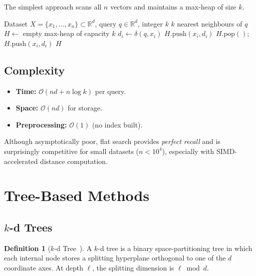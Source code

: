\documentclass[11pt,a4paper]{article}
\theoremstyle{definition}
\newtheorem{definition}{Definition}[section]
\newcommand{\R}{\mathbb{R}}
\newcommand{\calO}{\mathcal{O}}
\begin{document}
The simplest approach scans all $n$ vectors and maintains a max-heap of
size $k$.

\begin{algorithm}[H]
\caption{Flat $k$-NN Search}
\begin{algorithmic}[1]
\Require Dataset $X = \{x_1,\ldots,x_n\}\subset\R^d$, query $q\in\R^d$, integer $k$
\Ensure $k$ nearest neighbours of $q$
\State $H \gets$ empty max-heap of capacity $k$ 
  \State $d_i \gets \delta(q, x_i)$
    \State $H.\text{push}(x_i, d_i)$
    \State $H.\text{pop}()$;\; $H.\text{push}(x_i, d_i)$
  \EndIf
\EndFor
\State \Return $H$
\end{algorithmic}
\end{algorithm}

\subsection{Complexity}

\begin{itemize}[nosep]
  \item \textbf{Time:} $\calO(nd + n\log k)$ per query.
  \item \textbf{Space:} $\calO(nd)$ for storage.
  \item \textbf{Preprocessing:} $\calO(1)$ (no index built).
\end{itemize}

Although asymptotically poor, flat search provides \emph{perfect recall}
and is surprisingly competitive for small datasets ($n < 10^4$), especially
with SIMD-accelerated distance computation.


\section{Tree-Based Methods}\label{sec:tree}

\subsection{$k$-d Trees}

\begin{definition}[$k$-d Tree~\cite{bentley1975kdtree}]
A $k$-d tree is a binary space-partitioning tree in which each internal
node stores a splitting hyperplane orthogonal to one of the $d$
coordinate axes.  At depth $\ell$, the splitting dimension is
$\ell \bmod d$.
\end{definition}
\end{document}
